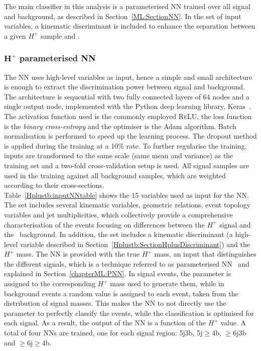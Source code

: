 The main classifier in this analysis is a parameterised NN trained over all signal and background, as described in Section~\ref{ML:SectionNN}. In the set of input variables, a kinematic discriminant is included to enhance the separation between a given $H^+$ sample and \ttjets.

\subsubsection{$\bm{H^+}$ parameterised NN}
\label{sec:HplusPNN}
The NN uses high-level variables as input, hence a simple and small architecture is enough to extract the discrimination power between signal and background. The architecture is sequential with two fully connected layers of 64 nodes and a single output node, implemented with the Python deep learning library, Keras~\cite{chollet2015keras}. The activation function used is the commonly employed \textsc{ReLU}, the loss function is the \textit{binary cross-entropy} and the optimiser is the Adam algorithm. Batch normalisation is performed to speed up the learning process. The dropout method is applied during the training at a 10\% rate. To further regularise the training, inputs are transformed to the same scale (same mean and variance) as the training set and a two-fold cross-validation setup is used. All signal samples are used in the training against all background samples, which are weighted according to their cross-sections.\\

Table~\ref{Hplustb:inputNNtable} shows the 15 variables used as input for the NN. The set includes several kinematic variables, geometric relations, event topology variables and jet multiplicities, which collectively provide a comprehensive characterisation of the events focusing on differences between the $H^+$ signal and the \ttbar\ background. In addition, the set includes a kinematic discriminant (a high-level variable described in Section~\ref{Hplustb:SectionHplusDiscriminant}) and the $H^+$ mass. The NN is provided with the true $H^+$ mass, an input that distinguishes the different signals, which is a technique referred to as parameterised NN~\cite{Baldi_2016} and explained in Section~\ref{chapterML:PNN}. In signal events, the parameter is assigned to the corresponding $H^+$ mass used to generate them, while in background events a random value is assigned to each event, taken from the distribution of signal masses. This makes the NN to not directly use the parameter to perfectly classify the events, while the classification is optimised for each signal. As a result, the output of the NN is a function of the $H^+$ value. A total of four NNs are trained, one for each signal region: 5j3b, 5j$\geq$4b, $\geq$6j3b and $\geq$6j$\geq$4b.\\

